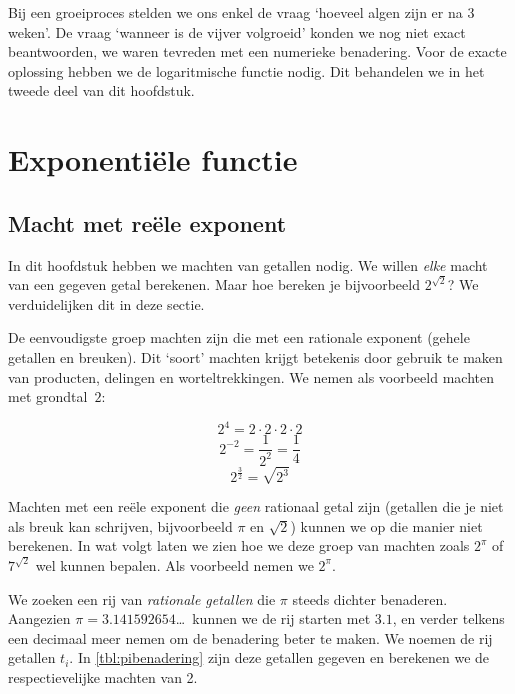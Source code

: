 Bij een groeiproces stelden we ons enkel de vraag `hoeveel algen zijn er na 3 weken'. De vraag `wanneer is de vijver volgroeid' konden we nog niet exact beantwoorden, we waren tevreden met een numerieke benadering. Voor de exacte oplossing hebben we de logaritmische functie nodig. Dit behandelen we in het tweede deel van dit hoofdstuk.

\section{ Exponenti\"{e}le functie}\label{sec.expfunctie}
\subsection{Macht met re\"ele exponent}\label{subsec:macht}
In dit hoofdstuk hebben we machten van getallen nodig. We willen \emph{elke} macht van een gegeven getal berekenen. Maar hoe bereken je bijvoorbeeld $2^{\sqrt 2}$? We verduidelijken dit in deze sectie.

De eenvoudigste groep machten zijn die  met een rationale exponent (gehele getallen en breuken).
Dit `soort' machten krijgt betekenis door gebruik te maken van
producten, delingen en worteltrekkingen. We nemen als voorbeeld machten met grondtal~$2$:

\begin{displaymath}
    2^{4}=2\cdot 2\cdot 2\cdot 2
\end{displaymath}
\begin{displaymath}
    2^{-2}=\frac{1}{2^{2}}=\frac{1}{4}
\end{displaymath}
\begin{displaymath}
    2^{\frac{3}{2}}=\sqrt{2^{3}}
\end{displaymath}

Machten met een re\"ele exponent die \emph{geen} rationaal getal zijn (getallen die je niet als breuk kan schrijven, bijvoorbeeld $\pi$ en  $\sqrt{2}$) kunnen we op die manier niet berekenen.
In wat volgt laten we zien hoe we deze groep van machten zoals $2^{\pi}$ of $7^{\sqrt{2}}$ wel kunnen bepalen.
Als voorbeeld nemen we $2^{\pi}$.

We zoeken een rij van \emph{rationale getallen} die $\pi$ steeds dichter
benaderen.
Aangezien $\pi=\num{3.141592654}$\dots\ kunnen we de rij starten met $\num{3.1}$,
en verder telkens een decimaal meer nemen om de benadering beter te
maken. We noemen de rij getallen $t_{i}$. In \cref{tbl:pibenadering}
zijn deze getallen gegeven en
berekenen we de respectievelijke machten van 2.

